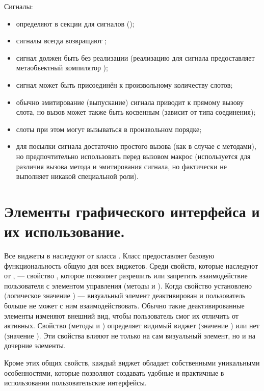 Сигналы:
\begin{itemize}
\item определяют в секции для сигналов ();
\item сигналы всегда возвращают ;
\item сигнал должен быть без реализации (реализацию для сигнала предоставляет метаобьектный компилятор );
\item сигнал может быть присоединён к произвольному количеству слотов;
\item обычно эмитирование (выпускание) сигнала приводит к прямому вызову слота, но вызов может также быть косвенным
(зависит от типа соединения);
\item слоты при этом могут вызываться в произвольном порядке;
\item для посылки сигнала достаточно простого вызова (как в случае с методами), но предпочтительно использовать перед
вызовом макрос  (используется для различия вызова метода и эмитирования сигнала, но фактически не
выполняет никакой специальной роли).
\end{itemize}

\section[Элементы графического интерфейса.]{Элементы графического интерфейса и их использование.
}
Все виджеты в  наследуют от класса . Класс  предоставляет базовую
функциональность общую для всех виджетов. Среди свойств, которые наследуют от , --- свойство
, которое позволяет разрешить или запретить взаимодействие пользователя с элементом управления (методы
 и ). Когда свойство установлено (логическое значение
) --- визуальный элемент деактивирован и пользователь больше не может с ним взаимодействовать. Обычно такие
деактивированные элементы изменяют внешний вид, чтобы пользователь смог их отличить от активных. Свойство
 (методы  и ) определяет видимый виджет
(значение ) или нет (значение ). Эти свойства влияют не только на сам визуальный элемент, но
и на дочерние элементы.

Кроме этих общих свойств, каждый виджет обладает собственными уникальными особенностями, которые позволяют создавать
удобные и практичные в использовании пользовательские интерфейсы.

